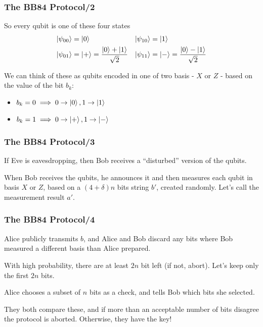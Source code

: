 \documentclass{beamer}
\begin{document}
  \begin{frame}
    \frametitle{The BB84 Protocol/2}
    So every qubit is one of these four states
    \begin{align*}
      \ket{\psi_{00}} &= \ket{0} & \ket{\psi_{10}} &= \ket{1} \\
      \ket{\psi_{01}} &= \ket{+} = \frac{\ket0 + \ket1}{\sqrt2} &\ket{\psi_{11}} &= \ket{-} = \frac{\ket0 - \ket1}{\sqrt2}
    \end{align*}

    We can think of these as qubits encoded in one of two basis - $X$ or $Z$ - based
    on the value of the bit $b_k$:
    \begin{itemize}
      \item $b_k = 0 \implies 0 \to \ket0, 1 \to \ket1$
      \item $b_k = 1 \implies 0 \to \ket{+}, 1 \to \ket{-}$
    \end{itemize}
  \end{frame}

  \begin{frame}
    \frametitle{The BB84 Protocol/3}
    If Eve is eavesdropping, then Bob receives a ``disturbed'' version of the qubits.

    When Bob receives the qubits, he announces it and then
    measures each qubit in basis $X$ or $Z$, based on a $(4+\delta)n$ bits
    string $b'$, created randomly. Let's call the measurement result $a'$.
  \end{frame}

  \begin{frame}
    \frametitle{The BB84 Protocol/4}
    Alice publicly transmits $b$, and Alice and Bob discard any bits where Bob measured
    a different basis than Alice prepared.

    With high probability, there are at least $2n$ bit left (if not, abort). Let's keep only the first $2n$ bits.

    Alice chooses a subset of $n$ bits as a check, and tells Bob which bits she selected.
    
    
    They both compare these, and if more than an acceptable number of bits disagree the protocol is aborted.
    Otherwise, they have the key!
  \end{frame}
\end{document}

